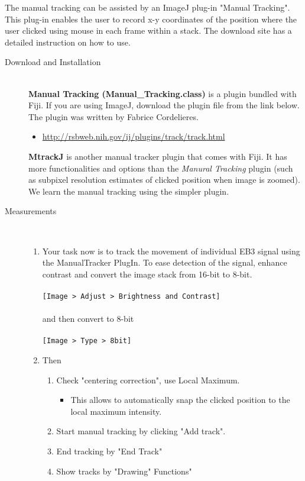 \documentclass[11pnt]{article}
\begin{document}
The manual tracking can be assisted by an ImageJ plug-in
"Manual Tracking". This plug-in
enables the user to record x-y coordinates of the position where the
user clicked using mouse in each frame within a stack. The download
site has a detailed instruction on how to use.  

\begin{description}
\item[Download and Installation]\hfill\\

\textbf{Manual Tracking (Manual\_Tracking.class)} is a plugin bundled with Fiji. If you are using ImageJ, download the plugin file from the link below. The plugin was written by Fabrice Cordelieres.
\begin{itemize}
\item \url{http://rsbweb.nih.gov/ij/plugins/track/track.html}
\end{itemize}

\textbf{MtrackJ} is another manual tracker plugin that comes with Fiji. It has more functionalities and options than the \textit{Manural Tracking} plugin (such as subpixel resolution estimates of clicked position when image is zoomed). We learn the manual tracking using the simpler plugin. 

\item[Measurements]\hfill\\

\begin{enumerate}
\item Your task now is to track the movement of individual EB3 signal using the ManualTracker PlugIn. To ease detection of the signal, enhance contrast and convert the image stack from 16-bit to 8-bit.
\\
\\
\verb"[Image > Adjust > Brightness and Contrast]"
\\
\\
and then convert to 8-bit
\\
\\
\verb"[Image > Type > 8bit]"
\\
\item Then 
\begin{enumerate}
\item Check "centering correction", use Local Maximum.
  \begin{itemize}
      \item This allows to automatically snap the clicked position to the local maximum intensity. 
  \end{itemize}
\item Start manual tracking by clicking "Add track".
\item End tracking by "End Track"
\item Show tracks by "Drawing" Functions"
\end{enumerate}


\end{enumerate}
\end{description}
\end{document}

